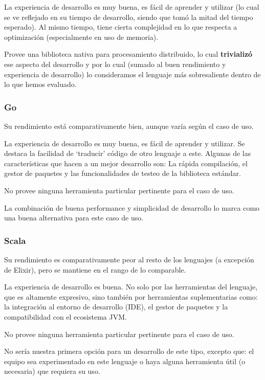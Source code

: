 \documentclass[11pt]{article}
\let\Oldsubsubsection\subsubsection
\renewcommand{\subsubsection}{\FloatBarrier\Oldsubsubsection}
\begin{document}
La experiencia de desarrollo es muy buena, es fácil de aprender y utilizar (lo cual se ve reflejado en su tiempo de desarrollo, siendo que tomó la mitad del tiempo esperado). Al mismo tiempo, tiene cierta complejidad en lo que respecta a optimización (especialmente en uso de memoria).

Provee una biblioteca nativa para procesamiento distribuido, lo cual \textbf{trivializó} ese aspecto del desarrollo y por lo cual (sumado al buen rendimiento y experiencia de desarrollo) lo consideramos el lenguaje más sobresaliente dentro de lo que hemos evaluado.

\subsubsection{Go}

Su rendimiento está comparativamente bien, aunque varía según el caso de uso.

La experiencia de desarrollo es muy buena, es fácil de aprender y utilizar. Se destaca la facilidad de ‘traducir’ código de otro lenguaje a este. Algunas de las características que hacen a un mejor desarrollo son: La rápida compilación, el gestor de paquetes y las funcionalidades de testeo de la biblioteca estándar.

No provee ninguna herramienta particular pertinente para el caso de uso.

La combinación de buena performance y simplicidad de desarrollo lo marca como una buena alternativa para este caso de uso.

\subsubsection{Scala}

Su rendimiento es comparativamente peor al resto de los lenguajes (a excepción de Elixir), pero se mantiene en el rango de lo comparable.

La experiencia de desarrollo es buena. No solo por las herramientas del lenguaje, que es altamente expresivo, sino también por herramientas suplementarias como: la integración al entorno de desarrollo (IDE), el gestor de paquetes y la compatibilidad con el ecosistema JVM.

No provee ninguna herramienta particular pertinente para el caso de uso.

No sería nuestra primera opción para un desarrollo de este tipo, excepto que: el equipo sea experimentado en este lenguaje o haya alguna herramienta útil (o necesaria) que requiera su uso.
\end{document}
